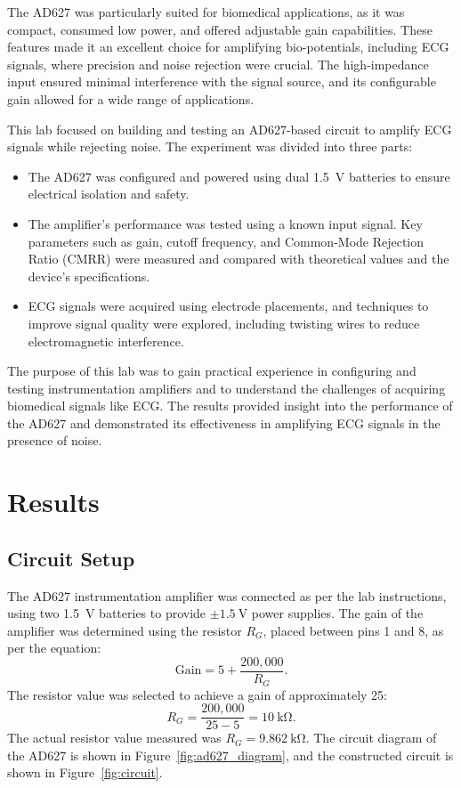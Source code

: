 The AD627 was particularly suited for biomedical applications, as it was compact, consumed low power, and offered adjustable gain
capabilities. These features made it an excellent choice for amplifying bio-potentials, including ECG signals, where precision and
noise rejection were crucial. The high-impedance input ensured minimal interference with the signal source, and its configurable
gain allowed for a wide range of applications.
\newline

This lab focused on building and testing an AD627-based circuit to amplify ECG signals while rejecting noise. The experiment was
divided into three parts:
\begin{itemize}
  \item The AD627 was configured and powered using dual 1.5~\si{\volt} batteries to ensure electrical isolation and safety.
  \item The amplifier's performance was tested using a known input signal. Key parameters such as gain, cutoff frequency, and
    Common-Mode Rejection Ratio (CMRR) were measured and compared with theoretical values and the device's specifications.
  \item ECG signals were acquired using electrode placements, and techniques to improve signal quality were explored, including
    twisting wires to reduce electromagnetic interference.
\end{itemize}

The purpose of this lab was to gain practical experience in configuring and testing instrumentation amplifiers and to understand
the challenges of acquiring biomedical signals like ECG. The results provided insight into the performance of the AD627 and
demonstrated its effectiveness in amplifying ECG signals in the presence of noise.

\section{Results}

\subsection{Circuit Setup}
The AD627 instrumentation amplifier was connected as per the lab instructions, using two 1.5~\si{\volt} batteries to provide
$\pm 1.5~\si{\volt}$ power supplies. The gain of the amplifier was determined using the resistor \( R_G \), placed between pins 1
and 8, as per the equation:
\[
  \text{Gain} = 5 + \frac{200,000}{R_G}.
\]
The resistor value was selected to achieve a gain of approximately 25:
\[
  R_G = \frac{200,000}{25 - 5} = 10~\si{\kilo\ohm}.
\]
The actual resistor value measured was \( R_G = 9.862~\si{\kilo\ohm} \). The circuit diagram of the AD627 is shown in
Figure~\ref{fig:ad627_diagram}, and the constructed circuit is shown in Figure~\ref{fig:circuit}.

